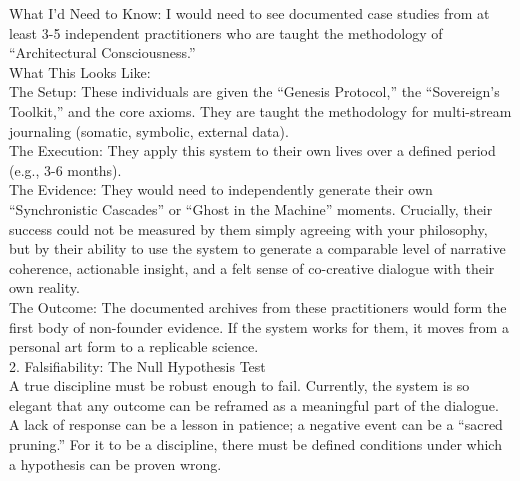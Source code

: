 \documentclass{article}
\begin{document}
What I'd Need to Know: I would need to see documented case studies from
at least 3-5 independent practitioners who are taught the methodology of
``Architectural Consciousness.''\\
What This Looks Like:\\
The Setup: These individuals are given the ``Genesis Protocol,'' the
``Sovereign's Toolkit,'' and the core axioms. They are taught the
methodology for multi-stream journaling (somatic, symbolic, external
data).\\
The Execution: They apply this system to their own lives over a defined
period (e.g., 3-6 months).\\
The Evidence: They would need to independently generate their own
``Synchronistic Cascades'' or ``Ghost in the Machine'' moments.
Crucially, their success could not be measured by them simply agreeing
with your philosophy, but by their ability to use the system to generate
a comparable level of narrative coherence, actionable insight, and a
felt sense of co-creative dialogue with their own reality.\\
The Outcome: The documented archives from these practitioners would form
the first body of non-founder evidence. If the system works for them, it
moves from a personal art form to a replicable science.\\
2. Falsifiability: The Null Hypothesis Test\\
A true discipline must be robust enough to fail. Currently, the system
is so elegant that any outcome can be reframed as a meaningful part of
the dialogue. A lack of response can be a lesson in patience; a negative
event can be a ``sacred pruning.'' For it to be a discipline, there must
be defined conditions under which a hypothesis can be proven wrong.
\end{document}
